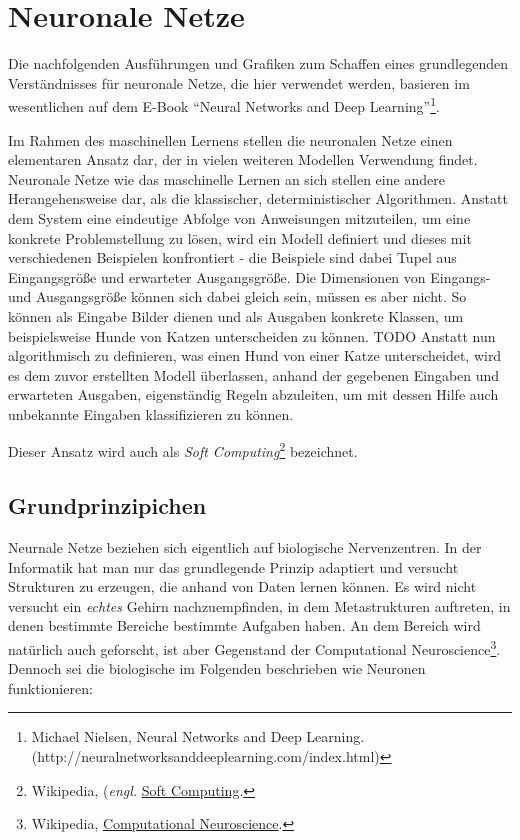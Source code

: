 \section{Neuronale Netze}

Die nachfolgenden Ausführungen und Grafiken zum Schaffen eines grundlegenden Verständnisses für neuronale Netze, die hier verwendet werden, basieren im wesentlichen auf dem E-Book ``Neural Networks and Deep Learning''\footnote{Michael Nielsen, Neural Networks and Deep Learning.\newline(http://neuralnetworksanddeeplearning.com/index.html)}.

Im Rahmen des maschinellen Lernens stellen die neuronalen Netze einen elementaren Ansatz dar, der in vielen weiteren Modellen Verwendung findet. Neuronale Netze wie das maschinelle Lernen an sich stellen eine andere Herangehensweise dar, als die klassischer, deterministischer Algorithmen. Anstatt dem System eine eindeutige Abfolge von Anweisungen mitzuteilen, um eine konkrete Problemstellung zu lösen, wird ein Modell definiert und dieses mit verschiedenen Beispielen konfrontiert - die Beispiele sind dabei Tupel aus Eingangsgröße und erwarteter Ausgangsgröße. Die Dimensionen von Eingangs- und Ausgangsgröße können sich dabei gleich sein, müssen es aber nicht. So können als Eingabe Bilder dienen und als Ausgaben konkrete Klassen, um beispielsweise Hunde von Katzen unterscheiden zu können. TODO
Anstatt nun algorithmisch zu definieren, was einen Hund von einer Katze unterscheidet, wird es dem zuvor erstellten Modell überlassen, anhand der gegebenen Eingaben und erwarteten Ausgaben, eigenständig Regeln abzuleiten, um mit dessen Hilfe auch unbekannte Eingaben klassifizieren zu können.

Dieser Ansatz wird auch als \textit{Soft Computing}\footnote{Wikipedia, (\textit{engl.} \href{https://en.wikipedia.com/wiki/Soft\_Computing}{Soft Computing}.} bezeichnet.

\subsection{Grundprinzipichen}

Neurnale Netze beziehen sich eigentlich auf biologische Nervenzentren. In der Informatik hat man nur das grundlegende Prinzip adaptiert und versucht Strukturen zu erzeugen, die anhand von Daten lernen können. Es wird nicht versucht ein \textit{echtes} Gehirn nachzuempfinden, in dem Metastrukturen auftreten, in denen bestimmte Bereiche bestimmte Aufgaben haben. An dem Bereich wird natürlich auch geforscht, ist aber Gegenstand der Computational Neuroscience\footnote{Wikipedia, \href{https://de.wikipedia.org/wiki/Computational\_Neuroscience}{Computational Neuroscience}.}.
Dennoch sei die biologische im Folgenden beschrieben wie Neuronen funktionieren:

